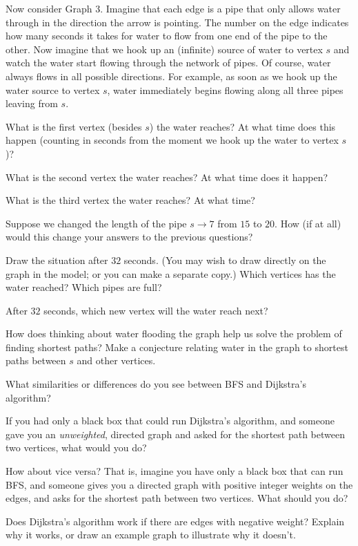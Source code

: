 \documentclass{tufte-handout}
\begin{document}
Now consider Graph 3.  Imagine that each edge is a pipe that only
allows water through in the direction the arrow is pointing.  The
number on the edge indicates how many seconds it takes for water to
flow from one end of the pipe to the other.  Now imagine that we hook
up an (infinite) source of water to vertex $s$ and watch the water
start flowing through the network of pipes.  Of course, water always
flows in all possible directions.  For example, as soon as we hook up
the water source to vertex $s$, water immediately begins flowing
along all three pipes leaving from $s$.
\begin{questions}
  \item What is the first vertex (besides $s$) the water reaches?  At
    what time does this happen (counting in seconds from the moment we
    hook up the water to vertex $s$)?
  \item What is the second vertex the water reaches?  At what time
    does it happen?
  \item What is the third vertex the water reaches?  At what time?
  \item Suppose we changed the length of the pipe $s \to 7$ from $15$
    to $20$.  How (if at all) would this change your answers to the
    previous questions?
  \item Draw the situation after $32$ seconds.  (You may wish to draw
    directly on the graph in the model; or you can make a separate
    copy.)  Which vertices has the water reached?  Which pipes are
    full?
  \item After $32$ seconds, which new vertex will the water reach next?
  \item How does thinking about water flooding the graph help us solve
    the problem of finding shortest paths?  Make a conjecture relating water in
    the graph to shortest paths between $s$ and other vertices.
\end{questions}

\pause

\begin{questions}
\item What similarities or differences do you see between BFS and
  Dijkstra's algorithm?
\item If you had only a black box that could run Dijkstra's algorithm,
  and someone gave you an \emph{unweighted}, directed graph and asked
  for the shortest path between two vertices, what would you do?
\item How about vice versa?  That is, imagine you have only a black
  box that can run BFS, and someone gives you a directed graph with
  positive integer weights on the edges, and asks for the shortest
  path between two vertices.  What should you do?
\item Does Dijkstra's algorithm work if there are edges with negative
  weight?  Explain why it works, or draw an example graph to illustrate
  why it doesn't.
\end{questions}
\end{document}

